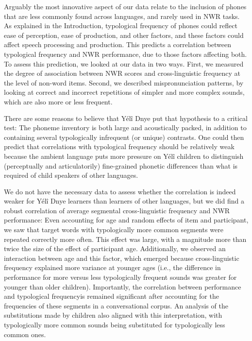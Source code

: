 \documentclass[
  english,
  ,man,floatsintext]{apa6}
\begin{document}
Arguably the most innovative aspect of our data relate to the inclusion of phones that are less commonly found across languages, and rarely used in NWR tasks. As explained in the Introduction, typological frequency of phones could reflect ease of perception, ease of production, and other factors, and these factors could affect speech processing and production. This predicts a correlation between typological frequency and NWR performance, due to those factors affecting both. To assess this prediction, we looked at our data in two ways. First, we measured the degree of association between NWR scores and cross-linguistic frequency at the level of non-word items. Second, we described mispronunciation patterns, by looking at correct and incorrect repetitions of simpler and more complex sounds, which are also more or less frequent.

There are some reasons to believe that Yélî Dnye put that hypothesis to a critical test: The phoneme inventory is both large and acoustically packed, in addition to containing several typologically infrequent (or unique) contrasts. One could then predict that correlations with typological frequency should be relatively weak because the ambient language puts more pressure on Yélî children to distinguish (perceptually and articulatorily) fine-grained phonetic differences than what is required of child speakers of other languages.

We do not have the necessary data to assess whether the correlation is indeed weaker for Yélî Dnye learners than learners of other languages, but we did find a robust correlation of average segmental cross-linguistic frequency and NWR performance: Even accounting for age and random effects of item and participant, we saw that target words with typologically more common segments were repeated correctly more often. This effect was large, with a magnitude more than twice the size of the effect of participant age. Additionally, we observed an interaction between age and this factor, which emerged because cross-linguistic frequency explained more variance at younger ages (i.e., the difference in performance for more versus less typologically frequent sounds was greater for younger than older children). Importantly, the correlation between performance and typological frequencyis remained significant after accounting for the frequencies of these segments in a conversational corpus. An analysis of the substitutions made by children also aligned with this interpretation, with typologically more common sounds being substituted for typologically less common ones.
\end{document}
